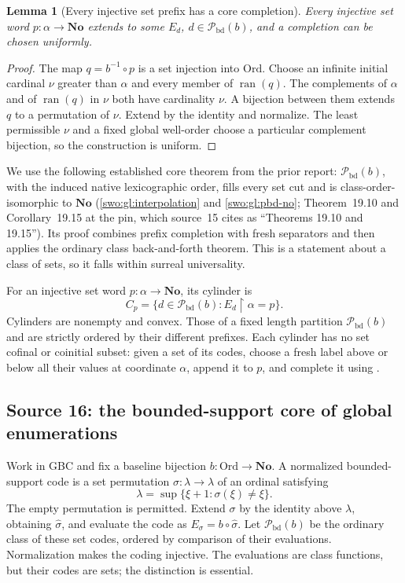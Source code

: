 \documentclass[11pt]{article}
\newtheorem{lemma}[lemma]{Lemma}
\theoremstyle{definition}
\theoremstyle{remark}
\newcommand{\No}{\mathbf{No}}
\newcommand{\Ord}{\mathrm{Ord}}
\newcommand{\Pbd}{\mathcal P_{\mathrm{bd}}}
\newcommand{\ran}{\operatorname{ran}}
\newcommand{\res}{\mathbin{\upharpoonright}}
\begin{document}
\begin{lemma}[Every injective set prefix has a core completion]\label{swo:cb:lem:completion}
Every injective set word $p:\alpha\to\No$ extends to some $E_d$,
$d\in \Pbd(b)$, and a completion can be chosen uniformly.
\end{lemma}
\begin{proof}
The map $q=b^{-1}\circ p$ is a set injection into $\Ord$. Choose an
infinite initial cardinal $\nu$ greater than $\alpha$ and every member
of $\ran(q)$. The complements of $\alpha$ and of $\ran(q)$ in $\nu$
both have cardinality $\nu$. A bijection between them extends $q$ to
a permutation of $\nu$. Extend by the identity and normalize.
The least permissible $\nu$ and a fixed global well-order choose a
particular complement bijection, so the construction is uniform.
\end{proof}

We use the following established core theorem from the prior report:
$\Pbd(b)$, with the induced native lexicographic order, fills every set cut
and is class-order-isomorphic to $\No$ (\cref{swo:gl:interpolation} and
\cref{swo:gl:pbd-no}; Theorem~19.10 and Corollary~19.15 at the pin, which
source~15 cites as ``Theorems 19.10 and 19.15'').
Its proof combines prefix completion with fresh separators and then
applies the ordinary class back-and-forth theorem. This is a statement
about a class of sets, so it falls within surreal universality.

For an injective set word $p:\alpha\to\No$, its cylinder is
\[
 C_p=\{d\in \Pbd(b):E_d\res\alpha=p\}.
\]
Cylinders are nonempty and convex. Those of a fixed length partition
$\Pbd(b)$ and are strictly ordered by their different prefixes. Each
cylinder has no set cofinal or coinitial subset: given a set of its
codes, choose a fresh label above or below all their values at coordinate
$\alpha$, append it to $p$, and complete it using .

\subsection{Source 16: the bounded-support core of global enumerations}\label{swo:ds:sec:core}

Work in GBC and fix a baseline bijection $b:\Ord\to\No$. A normalized
bounded-support code is a set permutation $\sigma:\lambda\to\lambda$
of an ordinal satisfying
\[
 \lambda=\sup\{\xi+1:\sigma(\xi)\ne\xi\}.
\]
The empty permutation is permitted. Extend $\sigma$ by the identity above
$\lambda$, obtaining $\widehat\sigma$, and evaluate the code as
$E_\sigma=b\circ\widehat\sigma$. Let $\Pbd(b)$ be the ordinary class of
these set codes, ordered by comparison of their evaluations. Normalization
makes the coding injective. The evaluations are class functions, but their
codes are sets; the distinction is essential.
\end{document}
